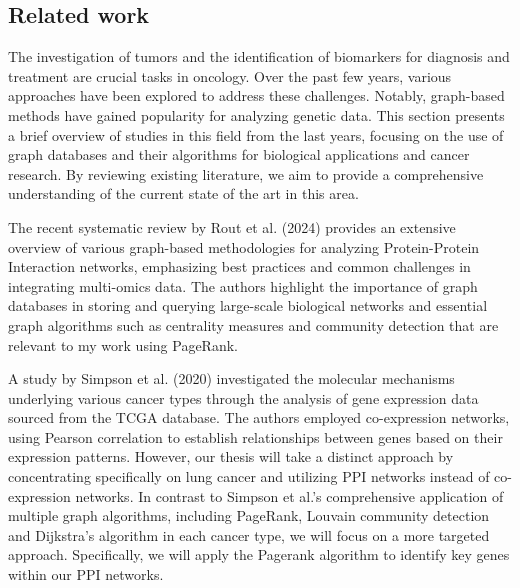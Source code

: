 \subsection{Related work} \label{subsec:related_work}
The investigation of tumors and the identification of biomarkers for diagnosis and treatment are crucial tasks in oncology.
Over the past few years, various approaches have been explored to address these challenges.
Notably, graph-based methods have gained popularity for analyzing genetic data.
This section presents a brief overview of studies in this field from the last years,
focusing on the use of graph databases and their algorithms for biological applications and cancer research.
By reviewing existing literature, we aim to provide a comprehensive understanding of the current state of the art in this area.


The recent systematic review by Rout et al. (2024) \cite{rout2024systematic} provides an extensive overview of
various graph-based methodologies for analyzing Protein-Protein Interaction networks,
emphasizing best practices and common challenges in integrating multi-omics data. %
The authors highlight the importance of graph databases in storing and querying large-scale biological networks
and essential graph algorithms such as centrality measures and community detection that are relevant to my work using PageRank.


A study by Simpson et al. (2020) \cite{simpson2020applying} investigated the molecular mechanisms underlying various cancer types
through the analysis of gene expression data sourced from the TCGA database.
The authors employed co-expression networks, using Pearson correlation to establish relationships between genes based on their expression patterns.
However, our thesis will take a distinct approach by concentrating specifically on lung cancer
and utilizing PPI networks instead of co-expression networks.
In contrast to Simpson et al.'s comprehensive application of multiple graph algorithms, including PageRank,
Louvain community detection and Dijkstra's algorithm in each cancer type, we will focus on a more targeted approach.
Specifically, we will apply the Pagerank algorithm to identify key genes within our PPI networks.


